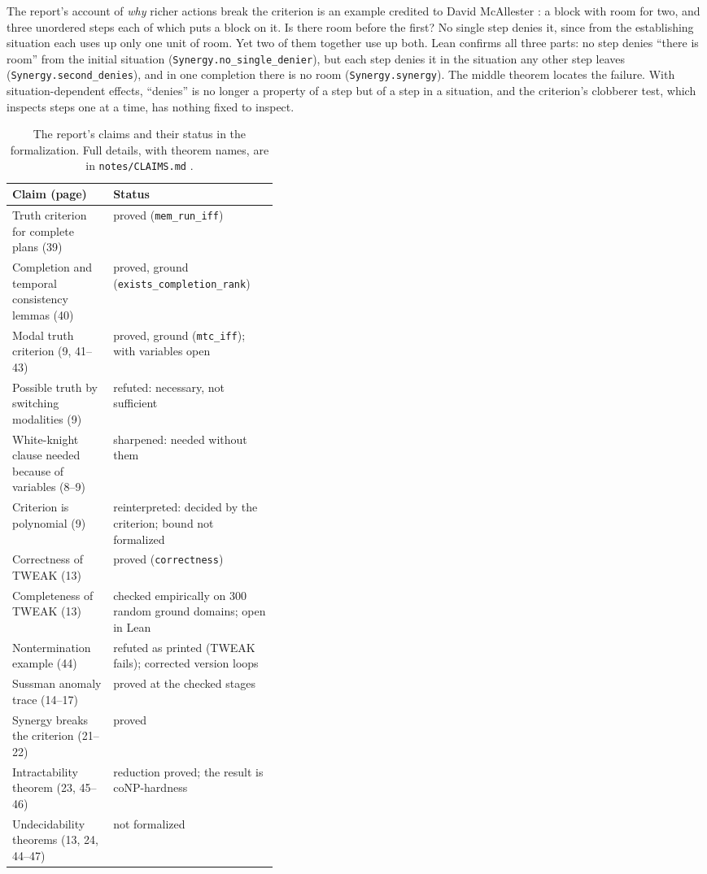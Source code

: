 \documentclass[11pt]{article}
\newcommand{\lean}[1]{\texttt{#1}}
\newcommand{\code}[1]{\texttt{#1}}
\begin{document}
The report's account of \emph{why} richer actions break the criterion is
an example credited to David McAllester \citep[pp.~21--22]{chapman1985}: a
block with room for two, and three unordered steps each of which puts a
block on it. Is there room before the first? No single step denies it,
since from the establishing situation each uses up only one unit of room.
Yet two of them together use up both. Lean confirms all three parts: no
step denies ``there is room'' from the initial situation
(\lean{Synergy.no\_single\_denier}), but each step denies it in the
situation any other step leaves (\lean{Synergy.second\_denies}), and in one
completion there is no room (\lean{Synergy.synergy}). The middle theorem
locates the failure. With situation-dependent effects, ``denies'' is no
longer a property of a step but of a step in a situation, and the
criterion's clobberer test, which inspects steps one at a time, has nothing
fixed to inspect.

\begin{table}[t]
\centering
\small
\begin{tabularx}{\linewidth}{>{\raggedright\arraybackslash}p{0.38\linewidth}X}
\toprule
Claim (page) & Status \\
\midrule
Truth criterion for complete plans (39) & proved (\lean{mem\_run\_iff}) \\
Completion and temporal consistency lemmas (40) & proved, ground (\lean{exists\_completion\_rank}) \\
Modal truth criterion (9, 41--43) & proved, ground (\lean{mtc\_iff}); with variables open \\
Possible truth by switching modalities (9) & refuted: necessary, not sufficient \\
White-knight clause needed because of variables (8--9) & sharpened: needed without them \\
Criterion is polynomial (9) & reinterpreted: decided by the criterion; bound not formalized \\
Correctness of TWEAK (13) & proved (\lean{correctness}) \\
Completeness of TWEAK (13) & checked empirically on 300 random ground domains; open in Lean \\
Nontermination example (44) & refuted as printed (TWEAK fails); corrected version loops \\
Sussman anomaly trace (14--17) & proved at the checked stages \\
Synergy breaks the criterion (21--22) & proved \\
Intractability theorem (23, 45--46) & reduction proved; the result is coNP-hardness \\
Undecidability theorems (13, 24, 44--47) & not formalized \\
\bottomrule
\end{tabularx}
\caption{The report's claims and their status in the formalization. Full
details, with theorem names, are in \code{notes/CLAIMS.md}
\citep{chapman85revisited}.}
\label{tab:claims}
\end{table}
\end{document}
